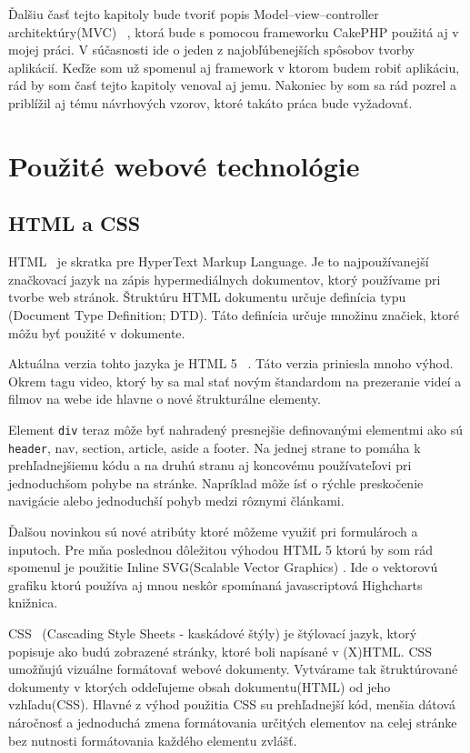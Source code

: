 \documentclass[12pt,oneside]{book}
\begin{document}
Ďalšiu časť tejto kapitoly bude tvoriť popis Model–view–controller architektúry(MVC) \cite{UvodMVC}\ , ktorá bude s pomocou frameworku CakePHP použitá aj v mojej práci. V súčasnosti ide o jeden z najobľúbenejších spôsobov tvorby aplikácií. Keďže som už spomenul aj framework v ktorom budem robiť aplikáciu, rád by som časť tejto kapitoly venoval aj jemu.
Nakoniec by som sa rád pozrel a priblížil aj tému návrhových vzorov, ktoré takáto práca bude vyžadovať.\newpage



\section{Použité webové technológie}
\subsection{HTML a CSS}
HTML \cite{HTML}\ je skratka pre HyperText Markup Language. Je to najpoužívanejší značkovací jazyk na zápis hypermediálnych dokumentov, ktorý používame pri tvorbe web stránok. Štruktúru HTML dokumentu určuje definícia typu (Document Type Definition; DTD). Táto definícia určuje množinu značiek, ktoré môžu byť použité v dokumente. 

Aktuálna verzia tohto jazyka je HTML 5 \cite{HTML5}\ . Táto verzia priniesla mnoho výhod. Okrem tagu video, ktorý by sa mal stať novým štandardom na prezeranie videí a filmov na webe ide hlavne o nové štrukturálne elementy.
 
Element \texttt{div} teraz môže byť nahradený presnejšie definovanými elementmi ako sú \texttt{header}, nav, section, article, aside a footer. Na jednej strane to pomáha k prehľadnejšiemu kódu a na druhú stranu aj koncovému používateľovi pri jednoduchšom pohybe na stránke. Napríklad môže ísť o rýchle preskočenie navigácie alebo jednoduchší pohyb medzi rôznymi článkami.

Ďalšou novinkou sú nové atribúty ktoré môžeme využiť pri formulároch a inputoch. Pre mňa poslednou dôležitou výhodou HTML 5 ktorú by som rád spomenul je použitie Inline SVG(Scalable Vector Graphics) . Ide o vektorovú grafiku ktorú používa aj mnou neskôr spomínaná javascriptová Highcharts knižnica.

CSS \cite{CSS21}\ (Cascading Style Sheets - kaskádové štýly) je štýlovací jazyk, ktorý popisuje ako budú zobrazené stránky, ktoré boli napísané v (X)HTML. CSS umožňujú vizuálne formátovať webové dokumenty. Vytvárame tak štruktúrované dokumenty v ktorých oddeľujeme obsah dokumentu(HTML) od jeho vzhľadu(CSS). Hlavné z výhod použitia CSS su prehľadnejší kód, menšia dátová náročnosť a jednoduchá zmena formátovania určitých elementov na celej stránke bez nutnosti formátovania každého elementu zvlášť. 
\end{document}
